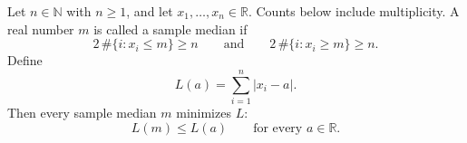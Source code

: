 \begin{theorem}
Let $n\in\mathbb{N}$ with $n\ge 1$, and let
$x_1,\ldots,x_n\in\mathbb{R}$. Counts below include multiplicity. A real
number $m$ is called a sample median if
\[
2\,\#\{i:x_i\le m\}\ge n
\qquad\text{and}\qquad
2\,\#\{i:x_i\ge m\}\ge n.
\]
Define
\[
L(a)=\sum_{i=1}^n |x_i-a|.
\]
Then every sample median $m$ minimizes $L$:
\[
L(m)\le L(a)
\qquad
\text{for every }a\in\mathbb{R}.
\]
\end{theorem}
